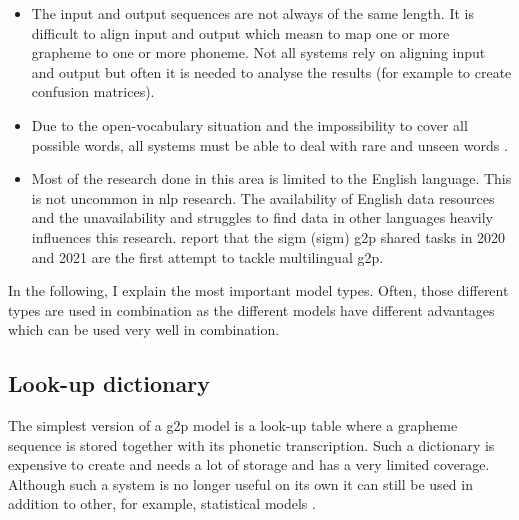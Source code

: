 \begin{itemize}
\item The input and output sequences are not always of the same length. It is difficult to align input and output which measn to map one or more grapheme to one or more phoneme. Not all systems rely on aligning input and output but often it is needed to analyse the results (for example to create confusion matrices). 
\item Due to the open-vocabulary situation and the impossibility to cover all possible words, all systems must be able to deal with rare and unseen words \citep{Rao2015GraphemetophonemeCU, ney-joint-sequence2008}. 
\item Most of the research done in this area is limited to the English language. This is not uncommon in \ac{nlp} research. The availability of English data resources and the unavailability and struggles to find data in other languages heavily influences this research. \citet{Ashby-Bartley.2021} report that the \acs{sigm} (\acl{sigm}) \ac{g2p} shared tasks in 2020 and 2021 are the first attempt to tackle multilingual \ac{g2p}.
\end{itemize}

In the following, I explain the most important model types. Often, those different types are used in combination as the different models have different advantages which can be used very well in combination. 

\subsection{Look-up dictionary} The simplest version of a \ac{g2p} model is a look-up table where a grapheme sequence is stored together with its phonetic transcription. Such a dictionary is expensive to create and needs a lot of storage and has a very limited coverage. Although such a system is no longer useful on its own it can still be used in addition to other, for example, statistical models \citep{ney-joint-sequence2008}.

